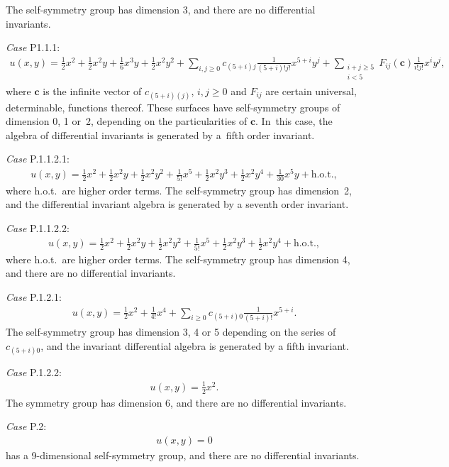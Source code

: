 \documentclass[pdftex]{sigma}%
\numberwithin{equation}{section}
\begin{document}
The self-symmetry group has dimension 3, and there are no differential invariants.

{\it Case} P1.1.1:
\begin{gather*}
u(x,y)=\frac{1}{2}x^2+\frac{1}{2}x^2y+\frac{1}{6}x^3y+\frac{1}{2}x^2y^2
+\sum_{i,j\geq 0}c_{(5+i)j}\frac{1}{(5+i)!j!}x^{5+i}y^{j}
+\!\!\sum_{\substack{ i+j\geq 5 \\ i<5}}\!F_{ij}(\mathbf{c})\frac{1}{i!j!}x^iy^j,
\end{gather*}
where $\mathbf{c}$ is the infinite vector of $c_{(5+i)(j)}$, $i,j\geq0$ and $F_{ij}$ are certain universal, determinable, functions thereof. These surfaces have self-symmetry groups of dimension 0, 1 or~2, depending on the particularities of $\mathbf{c}$. In~this case, the algebra of differential invariants is generated by a~fifth order invariant.

{\it Case} P.1.1.2.1:
\begin{gather*}
u(x,y) = \frac{1}{2}x^2+\frac{1}{2}x^2y+\frac{1}{2}x^2y^2+\frac{1}{5!}x^5+\frac{1}{2}x^2y^3+\frac{1}{2}x^2y^4 + \frac{1}{30} x^5y + \text{h.o.t.},
\end{gather*}
where h.o.t.\ are higher order terms. The self-symmetry group has dimension~2, and the diffe\-ren\-tial invariant algebra is generated by a seventh order invariant.

{\it Case} P.1.1.2.2:
\begin{gather*}
u(x,y)=\frac{1}{2}x^2+\frac{1}{2}x^2y+\frac{1}{2}x^2y^2+\frac{1}{5!}x^5+\frac{1}{2}x^2y^3+\frac{1}{2}x^2y^4 +\text{h.o.t.},
\end{gather*}
where h.o.t.\ are higher order terms. The self-symmetry group has dimension 4, and there are no differential invariants.

{\it Case} P.1.2.1:
\begin{gather*}
u(x,y)=\frac{1}{2}x^2+\frac{1}{4!}x^4+\sum_{i\geq 0}c_{(5+i)0}\frac{1}{(5+i)!}x^{5+i}.
\end{gather*}
The self-symmetry group has dimension 3, 4 or 5 depending on the series of $c_{(5+i)0}$, and the invariant differential algebra is generated by a fifth invariant.

{\it Case} P.1.2.2:
\begin{gather*}
u(x,y)=\frac{1}{2}x^2.
\end{gather*}
The symmetry group has dimension 6, and there are no differential invariants.

{\it Case} P.2:
\begin{gather*}
u(x,y)=0
\end{gather*}
has a 9-dimensional self-symmetry group, and there are no differential invariants.
\end{document}
